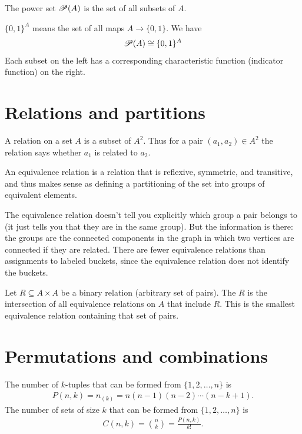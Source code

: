 \begin{definition}
The power set $\mathscr{P}(A)$ is the set of all subsets of $A$.

$\{0, 1\}^A$ means the set of all maps $A \to \{0, 1\}$. We have
\begin{align*}
  \mathscr{P}(A) \cong \{0, 1\}^A
\end{align*}
Each subset on the left has a corresponding characteristic function (indicator function) on the right.
\end{definition}


\section{Relations and partitions}
A relation on a set $A$ is a subset of $A^2$. Thus for a pair
$(a_1, a_2) \in A^2$ the relation says whether $a_1$ is related to $a_2$.

An equivalence relation is a relation that is reflexive, symmetric, and
transitive, and thus makes sense as defining a partitioning of the set into
groups of equivalent elements.

The equivalence relation doesn't tell you explicitly which group a pair belongs
to (it just tells you that they are in the same group). But the information is
there: the groups are the connected components in the graph in which two
vertices are connected if they are related. There are fewer equivalence
relations than assignments to labeled buckets, since the equivalence relation
does not identify the buckets. 

\begin{definition}
  Let $R \subseteq A \times A$ be a binary relation (arbitrary set of pairs). The 
  $R$ is the intersection of all equivalence relations on $A$ that include $R$. This is the smallest
  equivalence relation containing that set of pairs.
\end{definition}




\section{Permutations and combinations}

\begin{theorem*}
  The number of $k$-tuples that can be formed from $\{1, 2, \ldots, n\}$ is
  \begin{align*}
    P(n, k) = n_{(k)} = n(n-1)(n-2)\cdots(n-k+1).
  \end{align*}
  The number of sets of size $k$ that can be formed from $\{1, 2, \ldots, n\}$ is
  \begin{align*}
    C(n, k) = {n \choose k} = \frac{P(n, k)}{k!}.
  \end{align*}
\end{theorem*}

